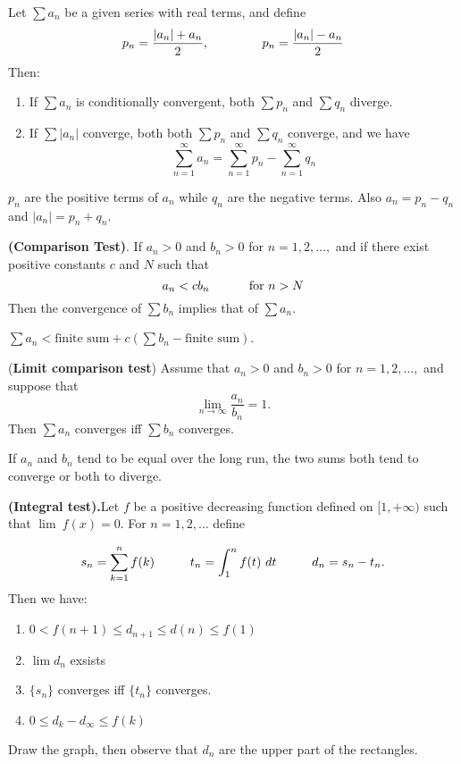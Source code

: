 \documentclass[10pt,a4paper]{book}
\begin{document}
\begin{Thm}
Let $\sum a_n$ be a given series with real terms, and define
$$p_n = \dfrac{|a_n| + a_n}{2}, \hspace*{1.5cm} p_n = \dfrac{|a_n| - a_n}{2}$$
Then:
\begin{enumerate}
    \item If $\sum a_n$ is conditionally convergent, both $\sum p_n$ and $\sum q_n$ diverge.
    \item If $\sum |a_n|$ converge, both both $\sum p_n$ and $\sum q_n$ converge, and we have
    $$\sum_{n =1 }^\infty a_n = \sum_{n =1 }^\infty p_n - \sum_{n =1 }^\infty q_n$$
\end{enumerate}
\end{Thm}
\PP $p_n$ are the positive terms of $a_n$ while $q_n$ are the negative terms. Also $a_n = p_n - q_n$ and $|a_n| = p_n + q_n$.
\renewcommand{\sp}{\hspace*{1cm}}
\begin{Thm}
\textbf{(Comparison Test)}. If $a_n > 0$ and $b_n > 0$ for $n = 1,2, \dots,$ and if there exist positive constants $c$ and $N$ such that
    $$a_n < cb_n \sp \text{ for } n > N$$
    Then the convergence of $\sum b_n$ implies that of $\sum a_n$.

\end{Thm}
\PP $\sum a_n < \text{finite sum} + c(\sum b_n - \text{finite sum})$.
\begin{Thm}
(\textbf{Limit comparison test}) Assume that $a_n > 0$ and $b_n > 0$ for
$n = 1, 2, \dots ,$ and suppose that
\[\lim_{n \rightarrow \infty} \frac{a_n}{b_n} = 1.\]
Then $\sum a_n$ converges iff $\sum b_n$ converges.
\end{Thm}
\PP  If $a_n$ and $b_n$ tend to be equal over the long run, the two sums both tend to converge or both to diverge.

\begin{Thm}
\textbf{(Integral test).}Let $f$ be a positive decreasing function defined on
$[1, +\infty)$ such that $\lim\ f(x) = 0.$ For $n = 1,2, \dots$ define

$$s_n = \sum_{k=1}^n f(k)\sp t_n = \int_1^n f(t)\ dt\sp d_n = s_n - t_n.$$
Then we have:
\begin{enumerate}
    \item $0 < f(n+1)\leq d_{n+1} \leq  d(n) \leq f(1)$
    \item $\lim d_n$ exsists
    \item $\{s_n\}$ converges iff $\{t_n\}$ converges.
    \item $0 \leq d_k - d_\infty  \leq f(k)$
\end{enumerate}
 
\end{Thm}
\PP Draw the graph, then observe that $d_n$ are the upper part of the rectangles.
\end{document}
